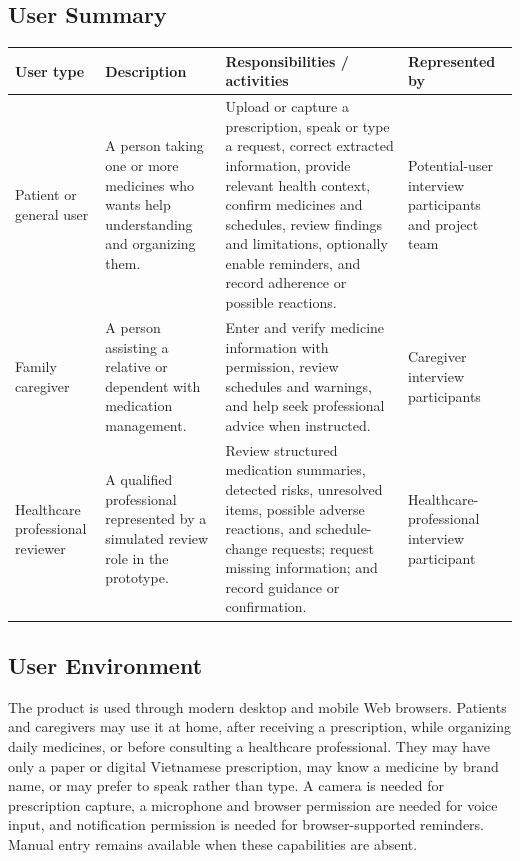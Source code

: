 \subsection{User Summary}

\begin{longtable}{|L{0.18\textwidth}|L{0.23\textwidth}|L{0.31\textwidth}|L{0.18\textwidth}|}
\hline
\textbf{User type} & \textbf{Description} & \textbf{Responsibilities / activities} & \textbf{Represented by}\\ \hline
Patient or general user & A person taking one or more medicines who wants help understanding and organizing them. & Upload or capture a prescription, speak or type a request, correct extracted information, provide relevant health context, confirm medicines and schedules, review findings and limitations, optionally enable reminders, and record adherence or possible reactions. & Potential-user interview participants and project team\\ \hline
Family caregiver & A person assisting a relative or dependent with medication management. & Enter and verify medicine information with permission, review schedules and warnings, and help seek professional advice when instructed. & Caregiver interview participants\\ \hline
Healthcare professional reviewer & A qualified professional represented by a simulated review role in the prototype. & Review structured medication summaries, detected risks, unresolved items, possible adverse reactions, and schedule-change requests; request missing information; and record guidance or confirmation. & Healthcare-professional interview participant\\ \hline
\end{longtable}

\subsection{User Environment}

The product is used through modern desktop and mobile Web browsers. Patients
and caregivers may use it at home, after receiving a prescription, while
organizing daily medicines, or before consulting a healthcare professional.
They may have only a paper or digital Vietnamese prescription, may know a
medicine by brand name, or may prefer to speak rather than type. A camera is
needed for prescription capture, a microphone and browser permission are needed
for voice input, and notification permission is needed for browser-supported
reminders. Manual entry remains available when these capabilities are absent.

